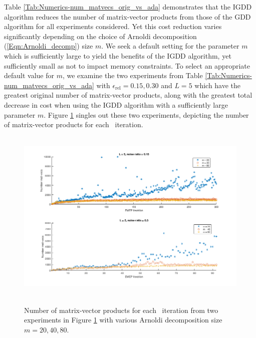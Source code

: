 Table \ref{Tab:Numerics-num_matvecs_orig_vs_ada} demonstrates that the IGDD algorithm reduces the number of matrix-vector products from those of the GDD algorithm for all experiments considered.
Yet this cost reduction varies significantly depending on the choice of Arnoldi decomposition (\ref{Eqn:Arnoldi_decomp}) size $m$.
We seek a default setting for the parameter $m$ which is sufficiently large to yield the benefits of the IGDD algorithm, yet sufficiently small as not to impact memory constraints.
To select an appropriate default value for $m$, we examine the two experiments from Table \ref{Tab:Numerics-num_matvecs_orig_vs_ada} with $\epsilon_\text{rel} = 0.15, 0.30$ and $L=5$ which have the greatest original number of matrix-vector products, along with the greatest total decrease in cost when using the IGDD algorithm with a sufficiently large parameter $m$.
Figure \ref{Fig:Numerics-num_matvecs_ada_for_m_vals} singles out these two experiments, depicting the number of matrix-vector products for each \emep \ iteration.

\begin{figure}[H]
\centering
\hbox{\hspace{-0.9cm} \includegraphics[scale=0.6]{Numerics-num_matvecs_ada_for_m_vals} }\vspace{0.0cm}
	\caption{Number of matrix-vector products for each \emep \ iteration from two experiments in Figure \ref{Fig:Numerics-num_matvecs_ada_for_m_vals} with various Arnoldi decomposition size $m=20, 40, 80$.}
\label{Fig:Numerics-num_matvecs_ada_for_m_vals}
\end{figure}




